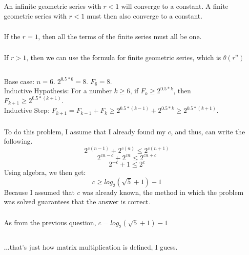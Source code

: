 \documentclass{article}
\begin{document}
\subsubsection{}An infinite geometric series with $r < 1$ will converge to a constant. A finite geometric series with $r < 1$ must then also converge to a constant. 
\subsubsection{}If the $r=1$, then all the terms of the finite series must all be one. 
\subsubsection{}If $r > 1$, then we can use the formula for finite geometric series, which is $\theta(r^n)$
\subsection{}
\subsubsection{}
Base case: $n = 6$. $2^{0.5*6} = 8$. $F_6 = 8$.\\
Inductive Hypothesis: For a number $k \geq 6$, if $F_k \geq 2^{0.5*k}$, then $F_{k+1} \geq 2^{0.5*(k + 1)}$.\\
Inductive Step: $F_{k+1} = F_{k-1} + F_k \geq 2^{0.5*(k-1)} + 2^{0.5*k} \geq 2^{0.5*(k+1)}$. 
\subsubsection{}
To do this problem, I assume that I already found my $c$, and thus, can write the following. 
$$2^{c(n-1)}+2^{c(n)} \leq 2^{c(n+1)}$$
$$2^{cn-c}+2^{cn} \leq 2^{cn+c}$$
$$2^{-c}+1 \leq 2^{c}$$
Using algebra, we then get: $$c \geq log_2(\sqrt{5}+1)-1$$
Because I assumed that $c$ was already known, the method in which the problem was solved guarantees that the answer is correct. 
\subsubsection{}As from the previous question, $c = log_2(\sqrt{5}+1)-1$
\subsection{}
\subsubsection{}...that's just how matrix multiplication is defined, I guess.
\end{document}
